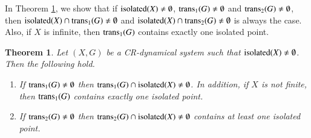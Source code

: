 \documentclass[a4paper,12pt]{article} %
\newcommand{\isolated}{\textup{isolated}}
\newcommand{\trans}{\textup{trans}}
\newtheorem{theorem}{Theorem}[section]
\begin{document}
In Theorem \ref{Fse11}, we show that if $\isolated(X)\neq \emptyset$, $\trans_1(G)\neq \emptyset$ and $\trans_2(G)\neq \emptyset$, then $\isolated(X)\cap \trans_1(G)\neq \emptyset$ and  $\isolated(X)\cap \trans_2(G)\neq \emptyset$ is always the case.  Also, if $X$ is infinite, then $\trans_1 (G)$ contains exactly one isolated point. 
	\begin{theorem} \label{Fse11}
		Let $(X,G)$ be a CR-dynamical system such that $\isolated(X)\neq \emptyset$. Then the following hold. 
		\begin{enumerate}
			\item If $\trans_1(G) \neq \emptyset$ then $\trans_1 (G)\cap \isolated(X)\neq \emptyset$. In addition, if $X$ is not finite, then  $\trans_1 (G)$ contains exactly one isolated point. 
			\item If $\trans_2(G) \neq \emptyset$ then $\trans_2 (G)\cap \isolated(X)\neq \emptyset$ contains at least one isolated point.
		\end{enumerate}
	\end{theorem}
\end{document}
